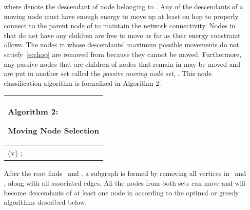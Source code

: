 \documentclass[10pt,conference]{IEEEtran}
\begin{document}
where  denote the descendant of node  belonging to
.
Any of the descendants of a moving node  must have enough energy to
move up at least on hop to properly connect to the parent node of 
to maintain the network connectivity.  Nodes in  that
do not have any children are free to move as far as their energy
constraint allows.  The nodes in  whose descendants'
maximum possible movements  do not satisfy~\autoref{eq:hop}
are removed from  because they cannot be moved.
Furthermore, any passive nodes that are children of nodes that remain
in  may be moved and are put in another set called the
{\it passive moving node set}, .  This node
classification algorithm is formalized in Algorithm 2.


\begin{algorithm}[htbp]

\begin{tabular}[c]{p{8cm}}

\hline
{\scriptsize \begin{bf}Algorithm 2: \end{bf} Moving Node Selection }\\
\hline
\SetKwFunction{GC}{GetChildren}
\SetKwFunction{CA}{CheckFlow}
\SetKwFunction{RP}{ReachParentPossible}

{\scriptsize \KwIn{The initial graph,  }
{\scriptsize \KwOut{The active moving set,  and the
    passive moving set, }


\CA(v) ;

\RP{v,}  \;

\ForEach{}{

\If{( == {\bf true})  () }{

 \GC{v}\;
\eIf{}{ \; }{
\If{\RP{v,} == {\bf true} } { \;
\ForEach{c  C}{ \If{\CA{c} == {\bf
false}} { \; } }

}

}

}

}

}

}

\\
\hline


\end{tabular}

\end{algorithm}

After the root finds \AM\ and \PM , a subgraph  is formed by removing all vertices in \AM\ and \PM,
along with all associated edges.  All the nodes from both sets can move
and will become descendants of at least one node in 
according to the optimal or greedy algorithms described below.
\end{document}
